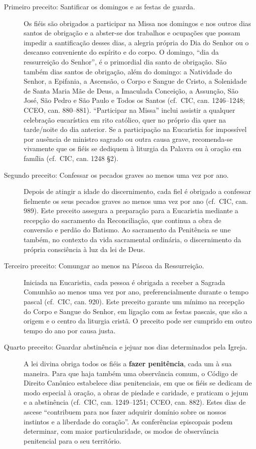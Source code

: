 \begin{description}

    \item[Primeiro preceito: Santificar os domingos e as festas de guarda.] Os fiéis são obrigados a participar na Missa nos domingos e nos outros dias santos de obrigação e a abster-se dos trabalhos e ocupações que possam impedir a santificação desses dias, a alegria própria do Dia do Senhor ou o descanso conveniente do espírito e do corpo. O domingo, ``dia da ressurreição do Senhor'', é o primordial dia santo de obrigação. São também dias santos de obrigação, além do domingo: a Natividade do Senhor, a Epifania, a Ascensão, o Corpo e Sangue de Cristo, a Solenidade de Santa Maria Mãe de Deus, a Imaculada Conceição, a Assunção, São José, São Pedro e São Paulo e Todos os Santos (cf.~CIC, can. 1246--1248; CCEO, can. 880--881). ``Participar na Missa'' inclui assistir a qualquer celebração eucarística em rito católico, quer no próprio dia quer na tarde/noite do dia anterior. Se a participação na Eucaristia for impossível por ausência de ministro sagrado ou outra causa grave, recomenda-se vivamente que os fiéis se dediquem à liturgia da Palavra ou à oração em família (cf.~CIC, can. 1248 §2).

    \item[Segundo preceito: Confessar os pecados graves ao menos uma vez por ano.] Depois de atingir a idade do discernimento, cada fiel é obrigado a confessar fielmente os seus pecados graves ao menos uma vez por ano (cf.~CIC, can. 989). Este preceito assegura a preparação para a Eucaristia mediante a recepção do sacramento da Reconciliação, que continua a obra de conversão e perdão do Batismo. Ao sacramento da Penitência se une também, no contexto da vida sacramental ordinária, o discernimento da própria consciência à luz da lei de Deus.

    \item[Terceiro preceito: Comungar ao menos na Páscoa da Ressurreição.] Iniciada na Eucaristia, cada pessoa é obrigada a receber a Sagrada Comunhão ao menos uma vez por ano, preferencialmente durante o tempo pascal (cf.~CIC, can. 920). Este preceito garante um mínimo na recepção do Corpo e Sangue do Senhor, em ligação com as festas pascais, que são a origem e o centro da liturgia cristã. O preceito pode ser cumprido em outro tempo do ano por causa justa.

    \item[Quarto preceito: Guardar abstinência e jejuar nos dias determinados pela Igreja.] A lei divina obriga todos os fiéis a \textbf{fazer penitência}, cada um à sua maneira. Para que haja também uma observância comum, o Código de Direito Canônico estabelece dias penitenciais, em que os fiéis se dedicam de modo especial à oração, a obras de piedade e caridade, e praticam o jejum e a abstinência (cf.~CIC, can. 1249--1251; CCEO, can. 882). Estes dias de ascese ``contribuem para nos fazer adquirir domínio sobre os nossos instintos e a liberdade do coração''. As conferências episcopais podem determinar, com maior particularidade, os modos de observância penitencial para o seu território.


\end{description}
